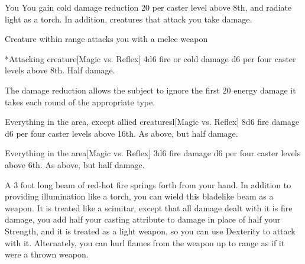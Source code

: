 \spelldur{\durshort \dismissable}
\begin{spelltarget}{You}
    \spelleffect You gain cold damage reduction 20  per caster level above 8th, and radiate light as a torch. In addition, creatures that attack you take damage.
\end{spelltarget}
\begin{spelltrigger}{Creature within \rngclose range attacks you with a melee weapon}
    \begin{spelltarget}*{Attacking creature}[Magic vs. Reflex]
        \spellsuccess 4d6 fire or cold damage \add d6 per four caster levels above 8th.
        \spellfailure Half damage.
    \end{spelltarget}
\end{spelltrigger}

\spellnotes The damage reduction allows the subject to ignore the first 20 energy damage it takes each round of the appropriate type.

\begin{spelltargets}{Everything in the area, except allied creatures}l[Magic vs. Reflex]
    \spellsuccess 8d6 fire damage \add d6 per four caster levels above 16th.
    \spellfailure As above, but half damage.
\end{spelltargets}

\begin{spelltargets}{Everything in the area}[Magic vs. Reflex]
    \spellsuccess 3d6 fire damage \add d6 per four caster levels above 6th.
    \spellfailure As above, but half damage.
\end{spelltargets}
\spellnotes \destructivespellnotes

\firespellnotes

\spelldur{\durlong \dismissable}
\spelleffect A 3 foot long beam of red-hot fire springs forth from your hand. In addition to providing illumination like a torch, you can wield this bladelike beam as a weapon. It is treated like a scimitar, except that all damage dealt with it is fire damage, you add half your casting attribute to damage in place of half your Strength, and it is treated as a light weapon, so you can use Dexterity to attack with it. Alternately, you can hurl flames from the weapon up to \rngmed range as if it were a thrown weapon.
\spellnotes \firespellnotes

